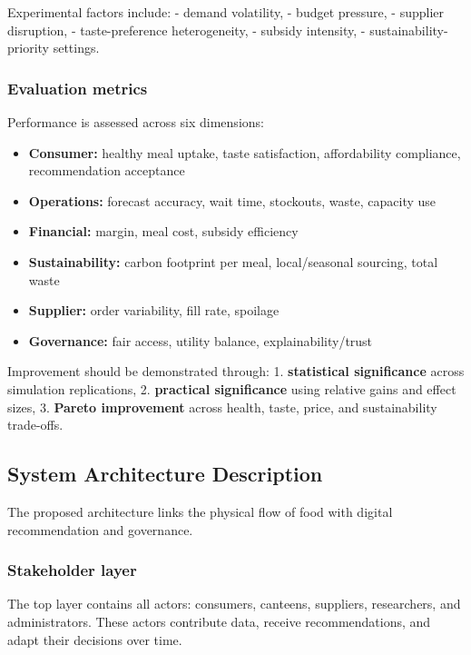 \documentclass[
  letterpaper,
  DIV=11,
  numbers=noendperiod]{scrartcl}
\providecommand{\tightlist}{%
  \setlength{\itemsep}{0pt}\setlength{\parskip}{0pt}}
\begin{document}
Experimental factors include: - demand volatility, - budget pressure, -
supplier disruption, - taste-preference heterogeneity, - subsidy
intensity, - sustainability-priority settings.

\subsubsection{Evaluation metrics}\label{evaluation-metrics}

Performance is assessed across six dimensions:

\begin{itemize}
\tightlist
\item
  \textbf{Consumer:} healthy meal uptake, taste satisfaction,
  affordability compliance, recommendation acceptance
\item
  \textbf{Operations:} forecast accuracy, wait time, stockouts, waste,
  capacity use
\item
  \textbf{Financial:} margin, meal cost, subsidy efficiency
\item
  \textbf{Sustainability:} carbon footprint per meal, local/seasonal
  sourcing, total waste
\item
  \textbf{Supplier:} order variability, fill rate, spoilage
\item
  \textbf{Governance:} fair access, utility balance,
  explainability/trust
\end{itemize}

Improvement should be demonstrated through: 1. \textbf{statistical
significance} across simulation replications, 2. \textbf{practical
significance} using relative gains and effect sizes, 3. \textbf{Pareto
improvement} across health, taste, price, and sustainability trade-offs.

\subsection{System Architecture
Description}\label{system-architecture-description}

The proposed architecture links the physical flow of food with digital
recommendation and governance.

\subsubsection{Stakeholder layer}\label{stakeholder-layer}

The top layer contains all actors: consumers, canteens, suppliers,
researchers, and administrators. These actors contribute data, receive
recommendations, and adapt their decisions over time.
\end{document}
